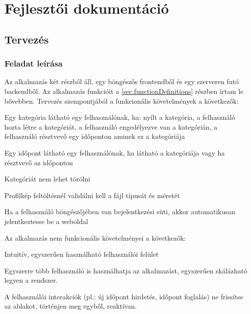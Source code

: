 \chapter{Fejlesztői dokumentáció} %
\label{ch:impl}

\section{Tervezés}

\subsection{Feladat leírása}

Az alkalmazás két részből áll, egy böngészős frontendből és egy szerveren futó backendből. Az alkalmazás funkcióit a \ref{sec:functionDefinitions} részben írtam le bővebben. Tervezés szempontjából a funkcionális követelmények a következők:

\begin{compactitem}
	\item Egy kategória látható egy felhasználónak, ha: nyílt a kategória, a felhasználó hozta létre a kategóriát, a felhasználó engedélyezve van a kategórián, a felhasználó résztvevő egy időponton aminek ez a kategóriája
	\item Egy időpont látható egy felhasználónak, ha látható a kategóriája vagy ha résztvevő az időponton
	\item Kategóriát nem lehet törölni
	\item Profilkép feltöltésnél validálni kell a fájl típusát és méretét
	\item Ha a felhasználó böngészőjében van bejelentkezési süti, akkor automatikusan jelentkeztesse be a weboldal
\end{compactitem}

Az alkalmazás nem funkcionális követelményei a következők:

\begin{compactitem}
	\item Intuitív, egyszerűen használható felhasználói felület
	\item Egyszerre több felhasználó is használhatja az alkalmazást, egyszerűen skálázható legyen a rendszer.
	\item A felhasználói interakciók (pl.: új időpont hirdetés, időpont foglalás) ne frissítse az ablakot, történjen meg egyből, reaktívan.
\end{compactitem}

\clearpage


